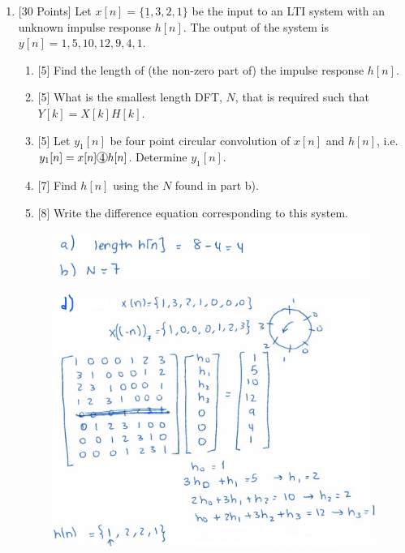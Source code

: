 \documentclass{article}
\newcommand*\encircle[1]{%
\tikz[baseline=(C.base)]\node[draw,circle,inner sep=0.5pt](C) {#1};
}
\begin{document}
\begin{enumerate}
    \vspace{1in}
    \item {[30 Points]} Let $x[n]=\{\underline{1},3,2,1\}$ be the input to an LTI system with an unknown impulse response $h[n]$. The output of the system is $y[n] = {1,5,10,12,9,4,1}$.
    \begin{enumerate}
        \item {[5]} Find the length of (the non-zero part of) the impulse response $h[n]$.
        \item {[5]} What is the smallest length DFT, $N$, that is required such that $Y[k] = X[k]H[k]$.
        \item {[5]} Let $y_1[n]$ be four point circular convolution of $x[n]$ and $h[n]$, i.e. $y_1[n] = x[n] \encircle{4} h[n] $. Determine $y_1[n]$.
        \item {[7]} Find $h[n]$ using the $N$ found in part b). 
        \item {[8]} Write the difference equation corresponding to this system.
    \end{enumerate}
    \begin{figure}[H]
        \centering
        \includegraphics[width=.85\textwidth]{mt2_q2_a_b.png}
    \end{figure}
    \vspace{1in}
    \begin{figure}[H]
        \centering
        \includegraphics[width=.85\textwidth]{mt2_q2_d.png}
    \end{figure}

\end{enumerate}
\end{document}
